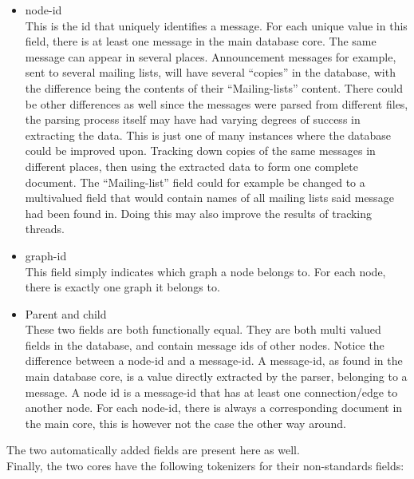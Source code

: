 \documentclass[a4paper,english]{report}
\begin{document}
\begin{itemize}

\item node-id\\ 
This is the id that uniquely identifies a message. For each unique value in this field, there is at least one message in the main database core. The same message can appear in several places. Announcement messages for example, sent to several mailing lists, will have several “copies” in the database, with the difference being the contents of their  “Mailing-lists” content. There could be other differences as well since the messages were parsed from different files, the parsing process itself may have had varying degrees of success in extracting the data. This is just one of many instances where the database could be improved upon. Tracking down copies of the same messages in different places, then using the extracted data to form one complete document. The “Mailing-list” field could for example be changed to a multivalued field that would contain names of all mailing lists said message had been found in. Doing this may also improve the results of tracking threads.  


\item graph-id \\
This field simply indicates which graph a node belongs to. For each node, there is exactly one graph it belongs to.

\item Parent and child\\
These two fields are both functionally equal. They are both multi valued fields in the database, and contain message ids of other nodes. Notice the difference between a node-id and a message-id.  A message-id, as found in the main database core, is a value directly extracted by the parser, belonging to a message. A node id is a message-id that has at least one connection/edge to another node. For each node-id, there is always a corresponding document in the main core, this is however not the case the other way around.


\end{itemize}

The two automatically added fields are present here as well.\\

Finally, the two cores have the following tokenizers for their non-standards fields:
\end{document}

